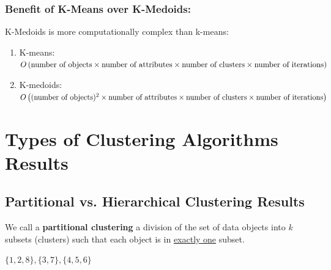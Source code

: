 \documentclass[11pt]{elegantbook}
\begin{document}
\subsubsection*{Benefit of K-Means over K-Medoids:}
K-Medoids is more computationally complex than k-means:
\begin{enumerate}
    \item K-means: $O\left(\textnormal{number of objects}\times \textnormal{number of attributes}\times \textnormal{number of clusters}\times \textnormal{number of iterations}\right)$
    \item K-medoids: $O\left((\textnormal{number of objects})^2\times \textnormal{number of attributes}\times \textnormal{number of clusters}\times \textnormal{number of iterations}\right)$
\end{enumerate}

\section{Types of Clustering Algorithms Results}
\subsection{Partitional vs. Hierarchical Clustering Results}
\begin{definition}
    We call a \textbf{partitional clustering} a division of the set of data objects into $k$ subsets (clusters) such that each object is in \underline{exactly one} subset.
\end{definition}
\begin{example}
    $\{1,2,8\},\{3,7\},\{4,5,6\}$
\end{example}
\end{document}
